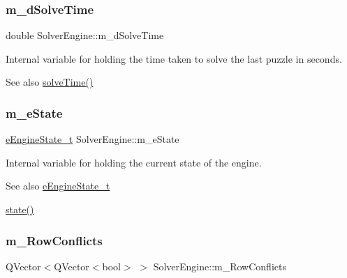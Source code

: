 \subsubsection{\texorpdfstring{m\+\_\+d\+Solve\+Time}{m\_dSolveTime}}
{\footnotesize\ttfamily double Solver\+Engine\+::m\+\_\+d\+Solve\+Time\hspace{0.3cm}{\ttfamily [private]}}



Internal variable for holding the time taken to solve the last puzzle in seconds. 

\begin{DoxySeeAlso}{See also}
\mbox{\hyperlink{class_solver_engine_aac9c7fba1a049fe08bcfd341700840fb}{solve\+Time()}} 
\end{DoxySeeAlso}
\mbox{\label{class_solver_engine_a5a5852eb51ce8b9c23daa43295b056a8}} 
\subsubsection{\texorpdfstring{m\+\_\+e\+State}{m\_eState}}
{\footnotesize\ttfamily \mbox{\hyperlink{class_solver_engine_acd25f3521e492d4aa924f922396bf02c}{e\+Engine\+State\+\_\+t}} Solver\+Engine\+::m\+\_\+e\+State\hspace{0.3cm}{\ttfamily [private]}}



Internal variable for holding the current state of the engine. 

\begin{DoxySeeAlso}{See also}
\mbox{\hyperlink{class_solver_engine_acd25f3521e492d4aa924f922396bf02c}{e\+Engine\+State\+\_\+t}} 

\mbox{\hyperlink{class_solver_engine_a6ac564f91cd5c523ece2c561a37b8263}{state()}} 
\end{DoxySeeAlso}
\mbox{\label{class_solver_engine_ab2c80d6912f12a59297ff17788eb15ff}} 
\subsubsection{\texorpdfstring{m\+\_\+\+Row\+Conflicts}{m\_RowConflicts}}
{\footnotesize\ttfamily Q\+Vector$<$Q\+Vector$<$bool$>$ $>$ Solver\+Engine\+::m\+\_\+\+Row\+Conflicts\hspace{0.3cm}{\ttfamily [private]}}



